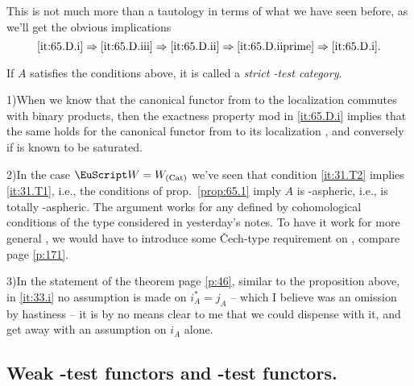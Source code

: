 This is not much more than a tautology in terms of what we have seen
before, as we'll get the obvious implications
\[ \text{\ref{it:65.D.i}}
\Rightarrow \text{\ref{it:65.D.iii}}
\Rightarrow \text{\ref{it:65.D.ii}}
\Rightarrow \text{\ref{it:65.D.iiprime}}
\Rightarrow \text{\ref{it:65.D.i}}.\]
\begin{definitionnum}\label{def:65.4}
  If $A$ satisfies the conditions above, it is called a \emph{strict
    \scrW-test category}.
\end{definitionnum}
\begin{remarks}
  1)\enspace When we know that the canonical functor from \Cat{} to the
  localization \HotW{} commutes with binary products, then the
  exactness property mod \scrW{} in \ref{it:65.D.i} implies that the
  same holds for the canonical functor from \Ahat{} to its
  localization \HotA, and conversely if \scrW{} is known to be
  saturated.

  2)\enspace In the case $\scrW=W_\Cat$ we've seen that condition
  \ref{it:31.T2} implies \ref{it:31.T1}, i.e., the conditions of
  prop.\ \ref{prop:65.1} imply $A$ is \scrW-aspheric, i.e.,
  \Ahat{} is totally \scrW-aspheric. The argument works for any
  \scrW{} defined by cohomological conditions of the type considered
  in yesterday's notes. To have it work for more general \scrW, we
  would have to introduce some \v Cech-type requirement on \scrW,
  compare page \ref{p:171}.

  3)\enspace In the statement of the theorem page \ref{p:46}, similar
  to the proposition above, in \ref{it:33.i} no assumption is made on
  $i_A^*=j_A$ -- which I believe was an omission by hastiness -- it is
  by no means clear to me that we could dispense with it, and get away
  with an assumption on $i_A$ alone.
\end{remarks}

\subsection{Weak \texorpdfstring{\scrW}{W}-test functors and
  \texorpdfstring{\scrW}{W}-test functors.}\label{subsec:65.E}

